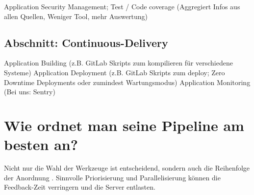 Application Security Management; Test / Code coverage (Aggregiert Infos aus allen Quellen, Weniger Tool, mehr Auswertung)

\subsection{Abschnitt: Continuous-Delivery}
Application Building (z.B. GitLab Skripts zum kompilieren für verschiedene Systeme)
Application Deployment (z.B. GitLab Skripts zum deploy; Zero Downtime Deployments oder zumindest Wartungsmodus)
Application Monitoring (Bei uns: Sentry)


\section{Wie ordnet man seine Pipeline am besten an?}

Nicht nur die Wahl der Werkzeuge ist entscheidend, sondern auch die Reihenfolge der Anordnung \cite{nemytchenkoGitLabCIRun2016}. 
Sinnvolle Priorisierung und Parallelisierung können die Feedback-Zeit verringern und die Server entlasten. 